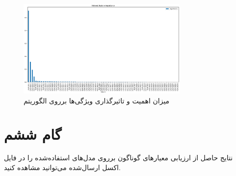 \documentclass{article}
\begin{document}
\begin{figure}[ht]
        \centering
        \includegraphics[width=0.75\textwidth]{standard-xgboost-importance.png}
        \caption{میزان اهمیت و تاثیرگذاری ویژگی‌ها برروی الگوریتم }
        \label{fig:fig10}
\end{figure}

\newpage
\section{گام ششم}
نتایج حاصل از ارزیابی معیارهای گوناگون برروی مدل‌‌های استفاده‌شده را در فایل اکسل ارسال‌شده می‌توانید مشاهده کنید.
\end{document}
